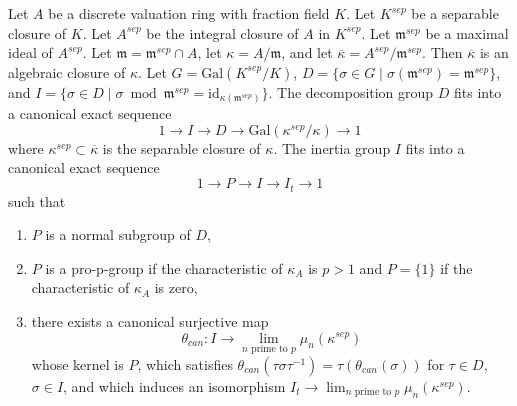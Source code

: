 \begin{lemma}
\label{lemma-structure-decomposition-separable-closure}
Let $A$ be a discrete valuation ring with fraction field $K$.
Let $K^{sep}$ be a separable closure of $K$.
Let $A^{sep}$ be the integral closure of $A$ in $K^{sep}$.
Let $\mathfrak m^{sep}$ be a maximal ideal of $A^{sep}$.
Let $\mathfrak m = \mathfrak m^{sep} \cap A$, let
$\kappa = A/\mathfrak m$, and let
$\overline{\kappa} = A^{sep}/\mathfrak m^{sep}$.
Then $\overline{\kappa}$ is an algebraic closure of $\kappa$.
Let $G = \text{Gal}(K^{sep}/K)$,
$D = \{\sigma \in G \mid \sigma(\mathfrak m^{sep}) = \mathfrak m^{sep}\}$, and
$I = \{\sigma \in D \mid \sigma \bmod \mathfrak m^{sep} =
\text{id}_{\kappa(\mathfrak m^{sep})}\}$.
The decomposition group $D$ fits into a canonical exact sequence
$$
1 \to I \to D \to \text{Gal}(\kappa^{sep}/\kappa) \to 1
$$
where $\kappa^{sep} \subset \overline{\kappa}$ is the separable
closure of $\kappa$.
The inertia group $I$ fits into a canonical exact sequence
$$
1 \to P \to I \to I_t \to 1
$$
such that
\begin{enumerate}
\item $P$ is a normal subgroup of $D$,
\item $P$ is a pro-p-group if the characteristic of
$\kappa_A$ is $p > 1$ and $P = \{1\}$ if the characteristic of $\kappa_A$
is zero,
\item there exists a canonical surjective map
$$
\theta_{can} : I \to \lim_{n\text{ prime to }p} \mu_n(\kappa^{sep})
$$
whose kernel is $P$, which satisfies
$\theta_{can}(\tau \sigma \tau^{-1}) = \tau(\theta_{can}(\sigma))$
for $\tau \in D$, $\sigma \in I$, and which induces an isomorphism
$I_t \to \lim_{n\text{ prime to }p} \mu_n(\kappa^{sep})$.
\end{enumerate}
\end{lemma}

